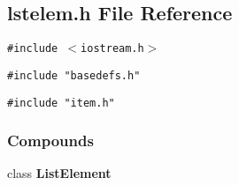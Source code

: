 \subsection{lstelem.h File Reference}
\label{lstelem.h}
{\tt \#include $<$iostream.h$>$}\par
{\tt \#include "basedefs.h"}\par
{\tt \#include "item.h"}\par
\subsubsection*{Compounds}
\begin{CompactItemize}
\item 
class {\bf List\-Element}
\end{CompactItemize}
